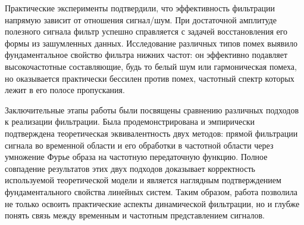 Практические эксперименты подтвердили, что эффективность фильтрации напрямую зависит от отношения сигнал/шум. При достаточной амплитуде полезного сигнала фильтр успешно справляется с задачей восстановления его формы из зашумленных данных. Исследование различных типов помех выявило фундаментальное свойство фильтра нижних частот: он эффективно подавляет высокочастотные составляющие, будь то белый шум или гармоническая помеха, но оказывается практически бессилен против помех, частотный спектр которых лежит в его полосе пропускания.

Заключительные этапы работы были посвящены сравнению различных подходов к реализации фильтрации. Была продемонстрирована и эмпирически подтверждена теоретическая эквивалентность двух методов: прямой фильтрации сигнала во временной области и его обработки в частотной области через умножение Фурье образа на частотную передаточную функцию. Полное совпадение результатов этих двух подходов доказывает корректность используемой теоретической модели и является наглядным подтверждением фундаментального свойства линейных систем. Таким образом, работа позволила не только освоить практические аспекты динамической фильтрации, но и глубже понять связь между временным и частотным представлением сигналов.
